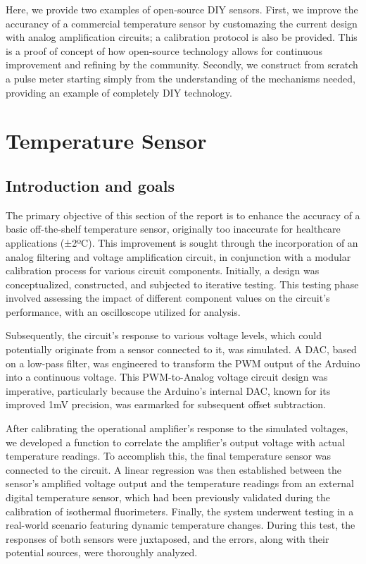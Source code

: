 \documentclass[conference]{IEEEtran}
\begin{document}
Here, we provide two examples of open-source DIY sensors. First, we improve 
the accurancy of a commercial temperature sensor by customazing the current design 
with analog amplification circuits; a calibration protocol is also be provided. 
This is a proof of concept of how open-source technology allows for continuous 
improvement and refining by the community. Secondly, we construct from scratch 
a pulse meter starting simply from the understanding of the mechanisms 
needed, providing an example of completely DIY technology.


\section{Temperature Sensor} %
   \subsection{Introduction and goals}
   The primary objective of this section of the report is to enhance the 
accuracy of a basic off-the-shelf temperature sensor, originally too 
inaccurate for healthcare applications (±2ºC). This improvement is sought 
through the incorporation of an analog filtering and voltage amplification 
circuit, in conjunction with a modular calibration process for various 
circuit components. Initially, a design was conceptualized, constructed, 
and subjected to iterative testing. This testing phase involved assessing 
the impact of different component values on the circuit's performance, 
with an oscilloscope utilized for analysis.

Subsequently, the circuit's response to various voltage levels, which could 
potentially originate from a sensor connected to it, was simulated. A DAC, 
based on a low-pass filter, was engineered to transform the PWM output of 
the Arduino into a continuous voltage. This PWM-to-Analog voltage circuit 
design was imperative, particularly because the Arduino's internal DAC, 
known for its improved 1mV precision, was earmarked for subsequent offset 
subtraction.

After calibrating the operational amplifier's response to the simulated 
voltages, we developed a function to correlate the amplifier's output 
voltage with actual temperature readings. To accomplish this, the final 
temperature sensor was connected to the circuit. A linear regression was 
then established between the sensor's amplified voltage output and the 
temperature readings from an external digital temperature sensor, which had 
been previously validated during the calibration of isothermal fluorimeters. 
Finally, the system underwent testing in a real-world scenario featuring 
dynamic temperature changes. During this test, the responses of both sensors 
were juxtaposed, and the errors, along with their potential sources, were 
thoroughly analyzed.
\end{document}
